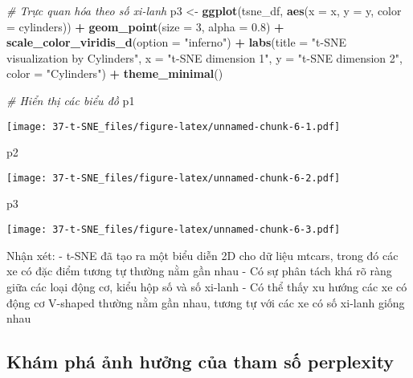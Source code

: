 \documentclass[
]{article}
\newenvironment{Shaded}{\begin{snugshade}}{\end{snugshade}}
\newcommand{\AttributeTok}[1]{\textcolor[rgb]{0.13,0.29,0.53}{#1}}
\newcommand{\CommentTok}[1]{\textcolor[rgb]{0.56,0.35,0.01}{\textit{#1}}}
\newcommand{\DecValTok}[1]{\textcolor[rgb]{0.00,0.00,0.81}{#1}}
\newcommand{\FloatTok}[1]{\textcolor[rgb]{0.00,0.00,0.81}{#1}}
\newcommand{\FunctionTok}[1]{\textcolor[rgb]{0.13,0.29,0.53}{\textbf{#1}}}
\newcommand{\NormalTok}[1]{#1}
\newcommand{\OtherTok}[1]{\textcolor[rgb]{0.56,0.35,0.01}{#1}}
\newcommand{\SpecialCharTok}[1]{\textcolor[rgb]{0.81,0.36,0.00}{\textbf{#1}}}
\newcommand{\StringTok}[1]{\textcolor[rgb]{0.31,0.60,0.02}{#1}}
\begin{document}
\begin{Shaded}
\begin{Highlighting}[]
\CommentTok{\# Trực quan hóa theo số xi{-}lanh}
\NormalTok{p3 }\OtherTok{\textless{}{-}} \FunctionTok{ggplot}\NormalTok{(tsne\_df, }\FunctionTok{aes}\NormalTok{(}\AttributeTok{x =}\NormalTok{ x, }\AttributeTok{y =}\NormalTok{ y, }\AttributeTok{color =}\NormalTok{ cylinders)) }\SpecialCharTok{+}
  \FunctionTok{geom\_point}\NormalTok{(}\AttributeTok{size =} \DecValTok{3}\NormalTok{, }\AttributeTok{alpha =} \FloatTok{0.8}\NormalTok{) }\SpecialCharTok{+}
  \FunctionTok{scale\_color\_viridis\_d}\NormalTok{(}\AttributeTok{option =} \StringTok{"inferno"}\NormalTok{) }\SpecialCharTok{+}
  \FunctionTok{labs}\NormalTok{(}\AttributeTok{title =} \StringTok{"t{-}SNE visualization by Cylinders"}\NormalTok{,}
       \AttributeTok{x =} \StringTok{"t{-}SNE dimension 1"}\NormalTok{,}
       \AttributeTok{y =} \StringTok{"t{-}SNE dimension 2"}\NormalTok{,}
       \AttributeTok{color =} \StringTok{"Cylinders"}\NormalTok{) }\SpecialCharTok{+}
  \FunctionTok{theme\_minimal}\NormalTok{()}

\CommentTok{\# Hiển thị các biểu đồ}
\NormalTok{p1}
\end{Highlighting}
\end{Shaded}

\texttt{[image: 37-t-SNE\_files/figure-latex/unnamed-chunk-6-1.pdf]}

\begin{Shaded}
\begin{Highlighting}[]
\NormalTok{p2}
\end{Highlighting}
\end{Shaded}

\texttt{[image: 37-t-SNE\_files/figure-latex/unnamed-chunk-6-2.pdf]}

\begin{Shaded}
\begin{Highlighting}[]
\NormalTok{p3}
\end{Highlighting}
\end{Shaded}

\texttt{[image: 37-t-SNE\_files/figure-latex/unnamed-chunk-6-3.pdf]}

Nhận xét: - t-SNE đã tạo ra một biểu diễn 2D cho dữ liệu mtcars, trong
đó các xe có đặc điểm tương tự thường nằm gần nhau - Có sự phân tách khá
rõ ràng giữa các loại động cơ, kiểu hộp số và số xi-lanh - Có thể thấy
xu hướng các xe có động cơ V-shaped thường nằm gần nhau, tương tự với
các xe có số xi-lanh giống nhau

\subsection{Khám phá ảnh hưởng của tham số
perplexity}\label{khuxe1m-phuxe1-ux1ea3nh-hux1b0ux1edfng-cux1ee7a-tham-sux1ed1-perplexity}
\end{document}
